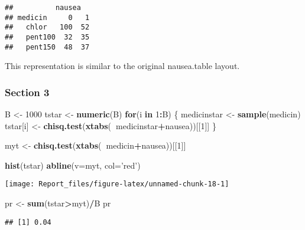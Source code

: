 \documentclass[]{article}
\newenvironment{Shaded}{\begin{snugshade}}{\end{snugshade}}
\newcommand{\KeywordTok}[1]{\textcolor[rgb]{0.13,0.29,0.53}{\textbf{#1}}}
\newcommand{\DataTypeTok}[1]{\textcolor[rgb]{0.13,0.29,0.53}{#1}}
\newcommand{\DecValTok}[1]{\textcolor[rgb]{0.00,0.00,0.81}{#1}}
\newcommand{\StringTok}[1]{\textcolor[rgb]{0.31,0.60,0.02}{#1}}
\newcommand{\ControlFlowTok}[1]{\textcolor[rgb]{0.13,0.29,0.53}{\textbf{#1}}}
\newcommand{\OperatorTok}[1]{\textcolor[rgb]{0.81,0.36,0.00}{\textbf{#1}}}
\newcommand{\NormalTok}[1]{#1}
\begin{document}
\begin{verbatim}
##          nausea
## medicin     0   1
##   chlor   100  52
##   pent100  32  35
##   pent150  48  37
\end{verbatim}

This representation is similar to the original nausea.table layout.

\subsubsection{Section 3}\label{section-3-2}

\begin{Shaded}
\begin{Highlighting}[]
\NormalTok{B <-}\StringTok{ }\DecValTok{1000}
\NormalTok{tstar <-}\StringTok{ }\KeywordTok{numeric}\NormalTok{(B)}
\ControlFlowTok{for}\NormalTok{(i }\ControlFlowTok{in} \DecValTok{1}\OperatorTok{:}\NormalTok{B)}
\NormalTok{\{}
\NormalTok{  medicinstar <-}\StringTok{ }\KeywordTok{sample}\NormalTok{(medicin) }
\NormalTok{  tstar[i] <-}\StringTok{ }\KeywordTok{chisq.test}\NormalTok{(}\KeywordTok{xtabs}\NormalTok{(}\OperatorTok{~}\NormalTok{medicinstar}\OperatorTok{+}\NormalTok{nausea))[[}\DecValTok{1}\NormalTok{]]}
\NormalTok{\}}

\NormalTok{myt <-}\StringTok{ }\KeywordTok{chisq.test}\NormalTok{(}\KeywordTok{xtabs}\NormalTok{(}\OperatorTok{~}\NormalTok{medicin}\OperatorTok{+}\NormalTok{nausea))[[}\DecValTok{1}\NormalTok{]]}

\KeywordTok{hist}\NormalTok{(tstar)}
\KeywordTok{abline}\NormalTok{(}\DataTypeTok{v=}\NormalTok{myt, }\DataTypeTok{col=}\StringTok{'red'}\NormalTok{)}
\end{Highlighting}
\end{Shaded}

\begin{center}\texttt{[image: Report\_files/figure-latex/unnamed-chunk-18-1]} \end{center}

\begin{Shaded}
\begin{Highlighting}[]
\NormalTok{pr <-}\StringTok{ }\KeywordTok{sum}\NormalTok{(tstar}\OperatorTok{>}\NormalTok{myt)}\OperatorTok{/}\NormalTok{B}
\NormalTok{pr}
\end{Highlighting}
\end{Shaded}

\begin{verbatim}
## [1] 0.04
\end{verbatim}
\end{document}
